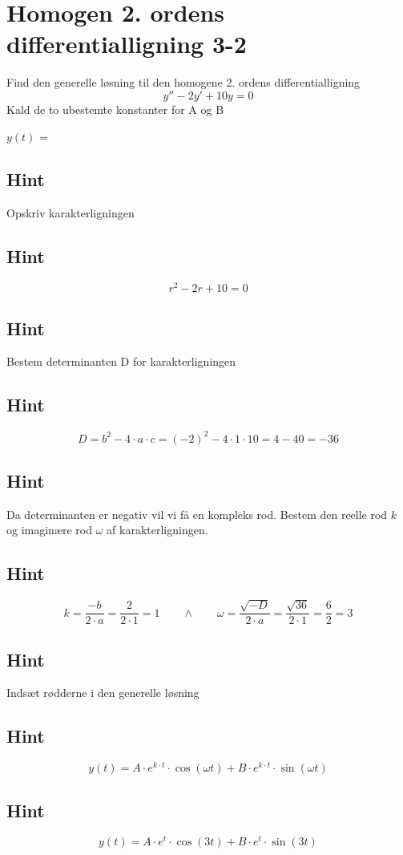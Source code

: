 \documentclass{article}
\newenvironment{exercise}[1]{\newpage\section{#1}}{}
\newcommand{\answerbox}[1]{\fbox{$#1$}}
\newcommand{\hint}{\subsection*{Hint}}
\begin{document}
\begin{exercise}{Homogen 2. ordens differentialligning 3-2}
	
	Find den generelle løsning til den homogene 2. ordens differentialligning
	\[
	y'' - 2y' + 10y = 0
	\]
	Kald de to ubestemte konstanter for A og B
	
	$y(t)$ = \answerbox{A \cdot e^{t}  \cdot \cos(3 t)+ B \cdot e^{t}  \cdot \sin(3 t)}
	
	
	\hint 
	
	Opskriv karakterligningen
	
	\hint
	
	\[
	r^2 - 2r + 10 = 0
	\]
	
	
	\hint
	
	Bestem determinanten D for karakterligningen
	
	
	\hint 
	\[
	D = b^2 - 4 \cdot a \cdot c = (-2)^2 - 4 \cdot 1 \cdot 10  = 4- 40 = -36
	\]
	
	\hint 
	Da determinanten er negativ vil vi få en kompleks rod. Bestem den reelle rod $k$ og imaginære rod $\omega$ af karakterligningen.
	
	
	\hint
	
	\[
	k = \frac{-b}{2 \cdot a} = \frac{2}{2 \cdot 1} = 1 \qquad \wedge \qquad \omega = \frac{\sqrt{-D}}{2 \cdot a} = \frac{\sqrt{36}}{2 \cdot 1} = \frac{6}{2} = 3
	\]
	
	\hint
	
	Indsæt rødderne i den generelle løsning
	
	\hint
	\[
	y(t) = A \cdot e^{k \cdot t}  \cdot \cos(\omega t)+ B \cdot e^{k \cdot t}  \cdot \sin(\omega t)
	\]
	
	\hint
	
	\[
	y(t) = A \cdot e^{t}  \cdot \cos(3 t)+ B \cdot e^{ t}  \cdot \sin(3t)
	\]
	
\end{exercise}

\newpage
\end{document}
